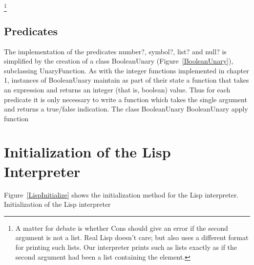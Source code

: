 \footnote{A matter for debate is whether Cons should give an error if the second
    argument is not a list.  Real Lisp doesn't care; but also uses a different
    format for printing such lists.  Our interpreter prints such as lists
    exactly as if the second argument had been a list containing the element.}

\subsection{Predicates}

The implementation of the predicates {\sf number?}, {\sf symbol?}, {\sf list?}
and {\sf null?} is simplified by the creation of a class {\sf BooleanUnary}
(Figure~\ref{BooleanUnary}), subclassing {\sf UnaryFunction}.  As with the
integer functions implemented in chapter 1, instances of {\sf BooleanUnary}
maintain as part of their state a function that takes an expression and returns
an integer (that is, boolean) value.  Thus for each predicate it is only
necessary to write a function which takes the single argument and returns a
true/false indication.
%
{The class {\sf BooleanUnary}}
%
{{\sf BooleanUnary} apply function}

\section{Initialization of the Lisp Interpreter}

Figure~\ref{LispInitialize} shows the initialization method for the Lisp
interpreter.
%
{Initialization of the Lisp interpreter}
